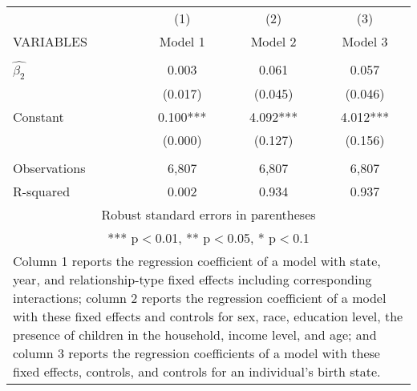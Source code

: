 \begin{tabular}{lccc}
\hline
 & (1) & (2) & (3) \\
VARIABLES & Model 1 & Model 2 & Model 3 \\ \hline
 &  &  &  \\
$\hat{\beta_2}$ & 0.003 & 0.061 & 0.057 \\
 & (0.017) & (0.045) & (0.046) \\
Constant & 0.100*** & 4.092*** & 4.012*** \\
 & (0.000) & (0.127) & (0.156) \\
 &  &  &  \\
Observations & 6,807 & 6,807 & 6,807 \\
 R-squared & 0.002 & 0.934 & 0.937 \\ \hline
\multicolumn{4}{c}{ Robust standard errors in parentheses} \\
\multicolumn{4}{c}{ *** p$<$0.01, ** p$<$0.05, * p$<$0.1} \\
\multicolumn{4}{p{0.8\linewidth}}{\small Column 1 reports the regression coefficient of a model with state, year, and relationship-type fixed effects including corresponding interactions; column 2 reports the regression coefficient of a model with these fixed effects and controls for sex, race, education level, the presence of children in the household, income level, and age; and column 3 reports the regression coefficients of a model with these fixed effects, controls, and controls for an individual’s birth state.} \\
\end{tabular}
